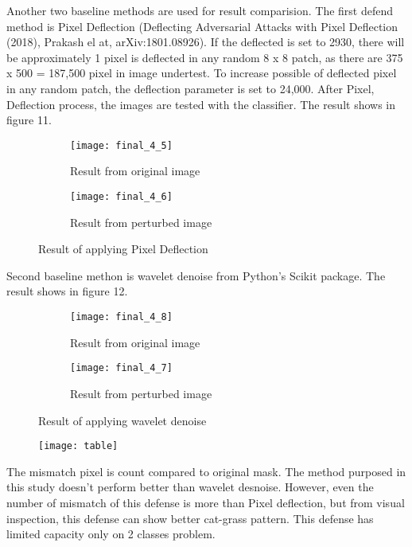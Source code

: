 \documentclass[11pt]{article}
\begin{document}
Another two baseline methods are used for result comparision. The first defend method is Pixel Deflection (Deflecting Adversarial Attacks with Pixel Deflection (2018), Prakash el at, arXiv:1801.08926). If the deflected is set to 2930, there will be approximately 1 pixel is deflected in any random 8 x 8 patch, as there are 375 x 500 = 187,500 pixel in image undertest. To increase possible of deflected pixel in any random patch, the deflection parameter is set to 24,000. After Pixel, Deflection process, the images are tested with the classifier. The result shows in figure 11. 

\begin{figure}[H]
\begin{subfigure}{.5\textwidth}
  \centering
  \texttt{[image: final\_4\_5]}
  \caption{Result from original image}
  \label{fig:}
\end{subfigure}
\begin{subfigure}{.5\textwidth}
  \centering
  \texttt{[image: final\_4\_6]}
  \caption{Result from perturbed image}
  \label{fig:}
\end{subfigure}
\caption{Result of applying Pixel Deflection}
\label{fig:}
\end{figure}

Second baseline methon is wavelet denoise from Python's Scikit package. The result shows in figure 12.

\begin{figure}[H]
\begin{subfigure}{.5\textwidth}
  \centering
  \texttt{[image: final\_4\_8]}
  \caption{Result from original image}
  \label{fig:}
\end{subfigure}
\begin{subfigure}{.5\textwidth}
  \centering
  \texttt{[image: final\_4\_7]}
  \caption{Result from perturbed image}
  \label{fig:}
\end{subfigure}
\caption{Result of applying wavelet denoise}
\label{fig:}
\end{figure}


\begin{figure}[H]
\centering
\texttt{[image: table]}
\end{figure}

The mismatch pixel is count compared to original mask. The method purposed in this study doesn't perform better than wavelet desnoise. However, even the number of mismatch of this defense is more than Pixel deflection, but from visual inspection, this defense can show better cat-grass pattern. This defense has limited capacity only on 2 classes problem.
\end{document}
